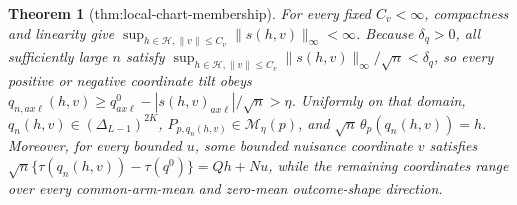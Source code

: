 \documentclass{article}
\newtheorem{theorem}{Theorem}
\begin{document}
\begin{theorem}[thm:local-chart-membership]\label{thm:local-chart-membership}
For every fixed \(C_v<\infty\), compactness and linearity give \(\sup_{h\in\mathcal H,\lVert v\rVert\le C_v}\lVert s(h,v)\rVert_\infty<\infty\). Because \(\delta_q>0\), all sufficiently large \(n\) satisfy \(\sup_{h\in\mathcal H,\lVert v\rVert\le C_v}\lVert s(h,v)\rVert_\infty/\sqrt n<\delta_q\), so every positive or negative coordinate tilt obeys \(q_{n,ax\ell}(h,v)\ge q^0_{ax\ell}-|s(h,v)_{ax\ell}|/\sqrt n>\eta\). Uniformly on that domain, \(q_n(h,v)\in(\Delta_{L-1})^{2K}\), \(P_{p,q_n(h,v)}\in\mathcal M_\eta(p)\), and \(\sqrt n\,\theta_p(q_n(h,v))=h\). Moreover, for every bounded \(u\), some bounded nuisance coordinate \(v\) satisfies \(\sqrt n\{\tau(q_n(h,v))-\tau(q^0)\}=Qh+Nu\), while the remaining coordinates range over every common-arm-mean and zero-mean outcome-shape direction.
\end{theorem}
\end{document}
